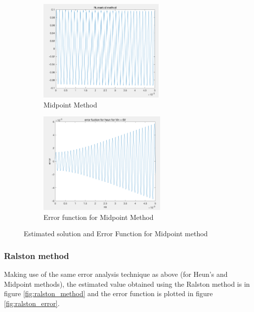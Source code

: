 \documentclass[11pt,a4paper]{article}
\begin{document}
\begin{figure}[h]
\begin{subfigure}{.5\textwidth}
  \includegraphics[width=.9\linewidth,height = 5cm
  ]{Ex2_Figs/midpoint_error_numerical_method}
  \caption[right]{Midpoint Method}
  \label{fig:midpoint_method}
\end{subfigure}
\begin{subfigure}{.5\textwidth}
  \includegraphics[width=.9\linewidth,height = 5cm]{Ex2_Figs/heun_error}
  \caption{Error function for Midpoint Method}
  \label{fig:midpoint_error}
\end{subfigure}
\caption{Estimated solution and Error Function for Midpoint method}
\label{fig:Method_Error_sub}
\end{figure}




\subsubsection{Ralston method}
Making use of the same error analysis technique as above (for Heun's and Midpoint methods), the estimated value obtained using the Ralston method is in figure \ref{fig:ralston_method} and the error function is plotted in figure \ref{fig:ralston_error}.
\end{document}
